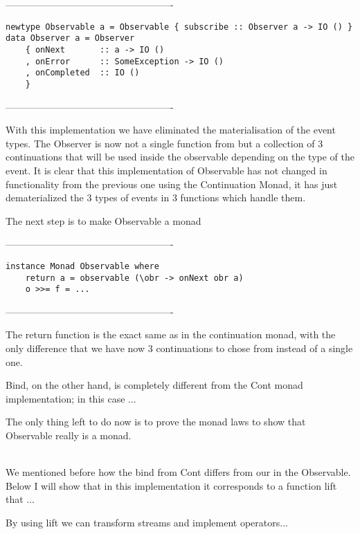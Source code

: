 ----------------------------------------------------
\begin{verbatim}
newtype Observable a = Observable { subscribe :: Observer a -> IO () } 
data Observer a = Observer 
    { onNext       :: a -> IO ()
    , onError      :: SomeException -> IO ()
    , onCompleted  :: IO ()
    }
\end{verbatim}
----------------------------------------------------    

With this implementation we have eliminated the materialisation of the event types. The Observer is now not a single function from  but a collection of 3 continuations that will be used inside the observable depending on the type of the event. It is clear that this implementation of Observable has not changed in functionality from the previous one using the Continuation Monad, it has just dematerialized the 3 types of events in 3 functions which handle them.

The next step is to make Observable a monad

----------------------------------------------------
\begin{verbatim}
instance Monad Observable where
	return a = observable (\obr -> onNext obr a)
	o >>= f = ...
\end{verbatim}
----------------------------------------------------  

The return function is the exact same as in the continuation monad, with the only difference that we have now 3 continuations to chose from instead of a single one. 

Bind, on the other hand, is completely different from the Cont monad implementation; in this case ... 

The only thing left to do now is to prove the monad laws to show that Observable really is a monad.

\\

We mentioned before how the bind from Cont differs from our in the Observable. Below I will show that in this implementation it corresponds to a function lift that ... 

By using lift we can transform streams and implement operators...


